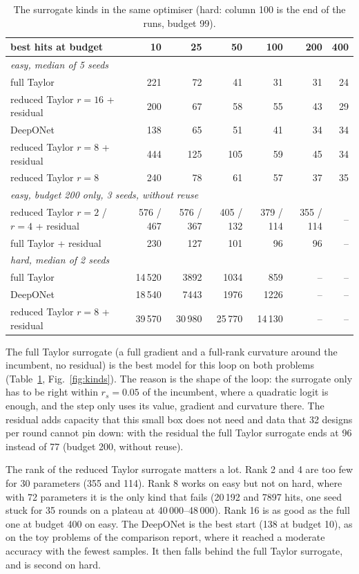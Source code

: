 \documentclass[11pt,a4paper]{article}
\begin{document}
\begin{table}[h]\centering\footnotesize
\begin{tabular}{lrrrrrr}
\toprule
best hits at budget & 10 & 25 & 50 & 100 & 200 & 400 \\
\midrule
\multicolumn{7}{l}{\emph{easy, median of 5 seeds}} \\
full Taylor & 221 & 72 & 41 & 31 & 31 & 24 \\
reduced Taylor $r=16$ + residual & 200 & 67 & 58 & 55 & 43 & 29 \\
DeepONet & 138 & 65 & 51 & 41 & 34 & 34 \\
reduced Taylor $r=8$ + residual & 444 & 125 & 105 & 59 & 45 & 34 \\
reduced Taylor $r=8$ & 240 & 78 & 61 & 57 & 37 & 35 \\
\multicolumn{7}{l}{\emph{easy, budget 200 only, 3 seeds, without reuse}} \\
reduced Taylor $r=2$ / $r=4$ + residual & 576 / 467 & 576 / 367 & 405 / 132 & 379 / 114 & 355 / 114 & -- \\
full Taylor + residual & 230 & 127 & 101 & 96 & 96 & -- \\
\midrule
\multicolumn{7}{l}{\emph{hard, median of 2 seeds}} \\
full Taylor & 14\,520 & 3892 & 1034 & 859 & -- & -- \\
DeepONet & 18\,540 & 7443 & 1976 & 1226 & -- & -- \\
reduced Taylor $r=8$ + residual & 39\,570 & 30\,980 & 25\,770 & 14\,130 & -- & -- \\
\bottomrule
\end{tabular}
\caption{The surrogate kinds in the same optimiser (hard: column 100 is the end of the runs,
budget 99).}
\label{tab:kinds}
\end{table}

The full Taylor surrogate (a full gradient and a full-rank curvature around the incumbent, no
residual) is the best model for this loop on both problems (Table~\ref{tab:kinds},
Fig.~\ref{fig:kinds}). The reason is the shape of the loop: the surrogate only has to be right
within $r_s=0.05$ of the incumbent, where a quadratic logit is enough, and the step only uses its
value, gradient and curvature there. The residual adds capacity that this small box does not need
and data that 32 designs per round cannot pin down: with the residual the full Taylor surrogate
ends at 96 instead of 77 (budget 200, without reuse).

The rank of the reduced Taylor surrogate matters a lot. Rank 2 and 4 are too few for 30
parameters (355 and 114). Rank 8 works on easy but not on hard, where with 72 parameters it is
the only kind that fails (20\,192 and 7897 hits, one seed stuck for 35 rounds on a plateau at
40\,000--48\,000). Rank 16 is as good as the full one at budget 400 on easy. The DeepONet is the best
start (138 at budget 10), as on the toy problems of the comparison report, where it reached a
moderate accuracy with the fewest samples. It then falls behind the full Taylor surrogate, and is
second on hard.
\end{document}
